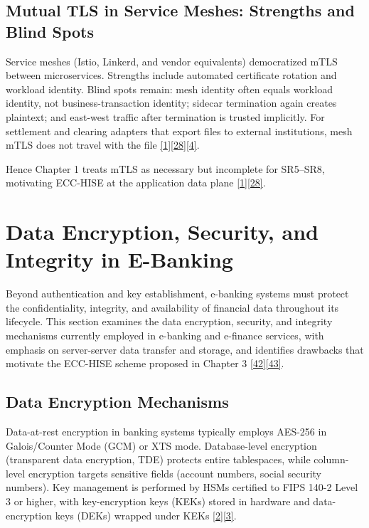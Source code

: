 \subsection{Mutual TLS in Service Meshes: Strengths and Blind Spots}

\indent Service meshes (Istio, Linkerd, and vendor equivalents) democratized mTLS between microservices. Strengths include automated certificate rotation and workload identity. Blind spots remain: mesh identity often equals workload identity, not business-transaction identity; sidecar termination again creates plaintext; and east-west traffic after termination is trusted implicitly. For settlement and clearing adapters that export files to external institutions, mesh mTLS does not travel with the file \hyperref[ref:1]{[1]}\hyperref[ref:28]{[28]}\hyperref[ref:4]{[4]}.

\indent Hence Chapter 1 treats mTLS as necessary but incomplete for SR5--SR8, motivating ECC-HISE at the application data plane \hyperref[ref:1]{[1]}\hyperref[ref:28]{[28]}.

\section{Data Encryption, Security, and Integrity in E-Banking}

\indent Beyond authentication and key establishment, e-banking systems must protect the confidentiality, integrity, and availability of financial data throughout its lifecycle. This section examines the data encryption, security, and integrity mechanisms currently employed in e-banking and e-finance services, with emphasis on server-server data transfer and storage, and identifies drawbacks that motivate the ECC-HISE scheme proposed in Chapter 3 \hyperref[ref:42]{[42]}\hyperref[ref:43]{[43]}.

\subsection{Data Encryption Mechanisms}

\indent Data-at-rest encryption in banking systems typically employs AES-256 in Galois/Counter Mode (GCM) or XTS mode. Database-level encryption (transparent data encryption, TDE) protects entire tablespaces, while column-level encryption targets sensitive fields (account numbers, social security numbers). Key management is performed by HSMs certified to FIPS 140-2 Level 3 or higher, with key-encryption keys (KEKs) stored in hardware and data-encryption keys (DEKs) wrapped under KEKs \hyperref[ref:2]{[2]}\hyperref[ref:3]{[3]}.

